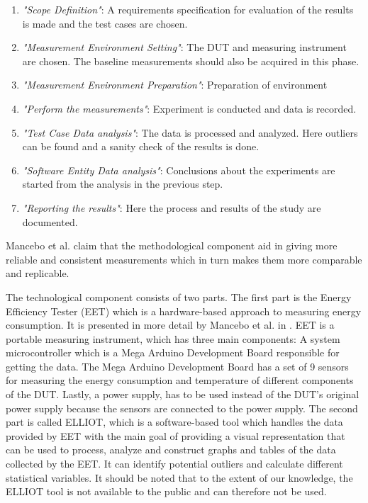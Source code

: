 \begin{enumerate}
    \item \textit{"Scope Definition"}: A requirements specification for evaluation of the results is made and the test cases are chosen.
    \item \textit{"Measurement Environment Setting"}: The DUT and measuring instrument are chosen. The baseline measurements should also be acquired in this phase.
    \item \textit{"Measurement Environment Preparation"}: Preparation of environment
    \item \textit{"Perform the measurements"}: Experiment is conducted and data is recorded. 
    \item \textit{"Test Case Data analysis"}: The data is processed and analyzed. Here outliers can be found and a sanity check of the results is done.
    \item \textit{"Software Entity Data analysis"}: Conclusions about the experiments are started from the analysis in the previous step.
    \item \textit{"Reporting the results"}: Here the process and results of the study are documented. 
\end{enumerate} 

Mancebo et al.\cite{GarciaFEETINGS} claim that the methodological component aid in giving more reliable and consistent measurements which in turn makes them more comparable and replicable. 

The technological component consists of two parts. The first part is the Energy Efficiency Tester (EET) which is a hardware-based approach to measuring energy consumption. It is presented in more detail by Mancebo et al. in \cite{GarciaEET}. EET is a portable measuring instrument, which has three main components: A system microcontroller which is a Mega Arduino Development Board responsible for getting the data. The Mega Arduino Development Board has a set of 9 sensors for measuring the energy consumption and temperature of different components of the DUT. Lastly, a power supply, has to be used instead of the DUT's original power supply because the sensors are connected to the power supply.\cite{GarciaEET} The second part is called ELLIOT, which is a software-based tool which handles the data provided by EET with the main goal of providing a visual representation that can be used to process, analyze and construct graphs and tables of the data collected by the EET. It can identify potential outliers and calculate different statistical variables.\cite{GarciaFEETINGS} It should be noted that to the extent of our knowledge, the ELLIOT tool is not available to the public and can therefore not be used.\newline

